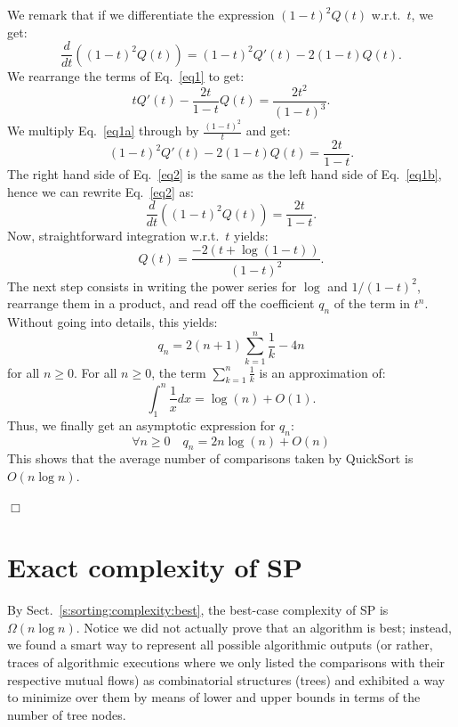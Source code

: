 \documentclass[a4paper]{book}
\theoremstyle{changebreak}                %
\newenvironment{proof}
 {{\sl Proof.}\hspace*{1 ex}}%
 {{\nopagebreak\hspace*{\fill}$\Box$\par\vspace{12pt}}}
\begin{document}
\begin{proof}
\begin{equation}
\end{equation}
We remark that if we differentiate the expression $(1-t)^2Q(t)$
w.r.t.~$t$, we get:
\begin{equation}
   \frac{d}{dt}((1-t)^2Q(t)) = (1-t)^2Q'(t) - 2(1-t)Q(t). \label{eq2}
\end{equation}
We rearrange the terms of Eq.~\eqref{eq1} to get:
\begin{equation}
  tQ'(t) - \frac{2t}{1-t} Q(t) = \frac{2t^2}{(1-t)^3}. \label{eq1a}
\end{equation}
We multiply Eq.~\eqref{eq1a} through by $\frac{(1-t)^2}{t}$ and get:
\begin{equation}
  (1-t)^2Q'(t) - 2(1-t)Q(t) = \frac{2t}{1-t}. \label{eq1b}
\end{equation}
The right hand side of Eq.~\eqref{eq2} is the same as the left hand
side of Eq.~\eqref{eq1b}, hence we can rewrite Eq.~\eqref{eq2} as:
\begin{equation}
   \frac{d}{dt}((1-t)^2Q(t)) = \frac{2t}{1-t}. \label{eq2a}
\end{equation}
Now, straightforward integration w.r.t.~$t$ yields:
\begin{equation}
  Q(t) = \frac{-2(t+\log(1-t))}{(1-t)^2}.
\end{equation}
The next step consists in writing the power
series for $\log$ and $1/(1-t)^2$,
rearrange them in a product, and read off the
coefficient $q_n$ of the term in $t^n$. Without going into details,
this yields:
\begin{equation}
  q_n = 2(n+1)\sum_{k=1}^n\frac{1}{k} - 4n
\end{equation}
for all $n\ge 0$. For all $n\ge 0$, the term
$\sum_{k=1}^n\frac{1}{k}$ is an approximation of:
\begin{equation}
  \int_1^n \frac{1}{x}dx=\log(n)+O(1).
\end{equation}
Thus, we finally get an asymptotic expression for $q_n$:
\begin{equation}
  \forall n\ge 0\quad q_n = 2n\log(n) + O(n)
\end{equation}
This shows that the average number of comparisons taken by {\sc
  QuickSort} is $O(n\log n)$.
\end{proof}

\section{Exact complexity of SP}
\label{s:sort:exact}
By Sect.~\ref{s:sorting:complexity:best}, the best-case complexity of
SP is $\Omega(n\log n)$. Notice we did not actually prove that an
algorithm is best; instead, we found a smart way to represent all
possible algorithmic outputs (or rather,
traces of algorithmic
executions where we only listed the
comparisons with their respective mutual flows) as
combinatorial structures
(trees) and exhibited a way to minimize over them by means
of lower and upper bounds in terms of the number of tree
nodes.
\end{document}

